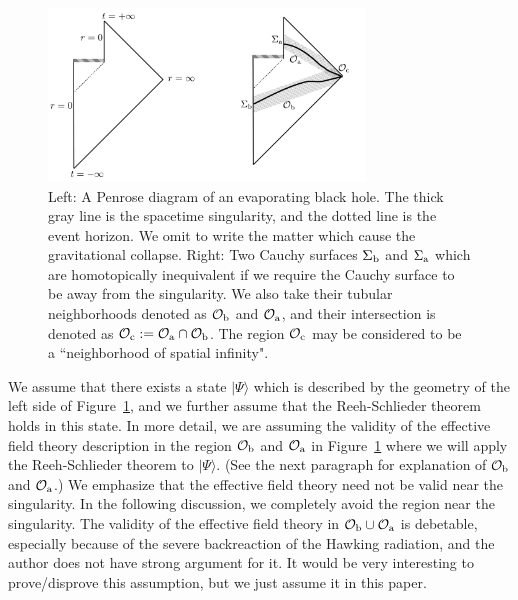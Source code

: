 \documentclass[12pt,a4paper]{article}
\theoremstyle{plain}
\theoremstyle{definition}
\numberwithin{thm}{section}
\newcommand{\ket}[1]{ | {#1} \rangle }
\def\CO{{\cal O}}
\begin{document}
\begin{figure}
\centering
\includegraphics[width=0.75\textwidth]{evaporate}
\caption{Left: A Penrose diagram of an evaporating black hole. The thick gray line is the spacetime singularity, and the dotted line is the event horizon.
We omit to write the matter which cause the gravitational collapse.
Right: Two Cauchy surfaces $\Sigma_{\rm b}$ and $\Sigma_{\rm a}$ which are homotopically inequivalent if we require the Cauchy surface to be away from the singularity. 
We also take their tubular neighborhoods denoted as $\CO_{\rm b}$ and $\CO_{\rm a}$, and their intersection is denoted as $\CO_{\rm c}:=\CO_{\rm a} \cap \CO_{\rm b} $.
The region $\CO_{\rm c}$ may be considered to be a ``neighborhood of spatial infinity".
 \label{fig:evaporate}}
\end{figure}

We assume that there exists a state $\ket{\Psi}$ which is described by the geometry of the left side of Figure~\ref{fig:evaporate},
and we further assume that the Reeh-Schlieder theorem holds in this state.
In more detail, we are assuming the validity of the effective field theory description in the region $\CO_{\rm b}$ and $\CO_{\rm a}$ in Figure~\ref{fig:evaporate} 
where we will apply the Reeh-Schlieder theorem to $\ket{\Psi}$. (See the next paragraph for explanation of $\CO_{\rm b}$ and $\CO_{\rm a}$.)
We emphasize that the effective field theory need not be valid near the singularity. In the following discussion,
we completely avoid the region near the singularity.
The validity of the effective field theory in $\CO_{\rm b} \cup \CO_{\rm a}$ is debetable,
especially because of the severe backreaction of the Hawking radiation, and
the author does not have strong argument for it. It would be very interesting
to prove/disprove this assumption,
but we just assume it in this paper. 
\end{document}
